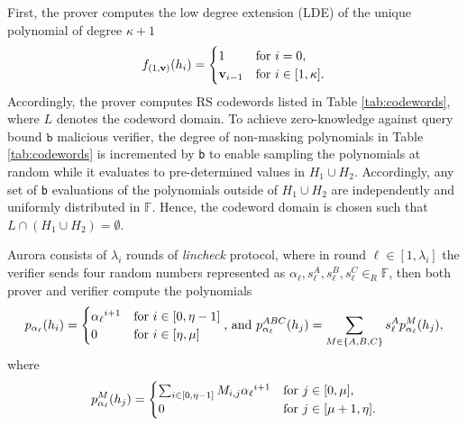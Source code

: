 %
%
%
%


First, the prover computes the low degree extension (LDE) of the unique polynomial of degree $\kappa+1$
\begin{equation*}
	f_{(1,{\bf{v}})}(h_i) = \begin{cases}
		1 & \text{for $i = 0$},\\
		{\bf{v}}_{i-1} &  \text{for $i \in [1,\kappa]$}.
	\end{cases}
\end{equation*}
Accordingly, the prover computes RS codewords listed in Table \ref{tab:codewords}, where $L$ denotes the codeword domain. To achieve zero-knowledge against query bound $\texttt{b}$ malicious verifier, the degree of non-masking polynomials in Table \ref{tab:codewords} is incremented by \texttt{b} to enable sampling the polynomials at random while it evaluates to pre-determined values in $H_1 \cup H_2$. Accordingly, any set of \texttt{b} evaluations of the polynomials outside of $H_1 \cup H_2$ are independently and uniformly distributed in $\mathbb{F}$. Hence, the codeword domain is chosen such that  $L \cap (H_1 \cup H_2) = \emptyset$. 

Aurora consists of $\lambda_i$ rounds of \textit{lincheck} protocol, where in round $\ell \in [1,\lambda_i]$ the verifier sends four random numbers represented as $\alpha_\ell, s^A_\ell, s^B_\ell, s^C_\ell  \in_R \mathbb{F}$, then both prover and verifier compute the polynomials
\begin{equation}\label{eq:pa}
	p_{\alpha_\ell}(h_i) = \begin{cases}
		{\alpha_\ell} ^ {i+1} & \text{for $i \in [0,\eta-1]$}\\
		0          & \text{for $ i  \in [\eta,  \mu]$}%
\end{cases}
\text{, and }
p^{ABC}_{\alpha_\ell}(h_j) = 
\sum_{M\in \{A, B, C\}} s^A_\ell p^{M}_{\alpha_\ell}(h_j),%
\end{equation}
where
\begin{equation}\label{eq:paABC}
p^{M}_{\alpha_\ell}(h_j) =  \begin{cases}
\sum_{i\in[0,\eta-1]} M_{i,j}{\alpha_\ell} ^ {i+1} & \text{for $j \in [0,\mu]$},\\
0          & \text{for $ j  \in [\mu+1,  \eta]$}.%
\end{cases}
\end{equation}

